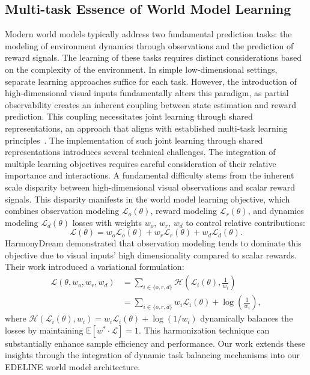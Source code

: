 \subsection{Multi-task Essence of World Model Learning}
Modern world models \cite{Kaiser2020SimPLe, hafner2021DreamerV2, hafner2024DreamerV3, alonso2024diamond} typically address two fundamental prediction tasks: the modeling of environment dynamics through observations and the prediction of reward signals. The learning of these tasks requires distinct considerations based on the complexity of the environment. In simple low-dimensional settings, separate learning approaches suffice for each task. However, the introduction of high-dimensional visual inputs fundamentally alters this paradigm, as partial observability creates an inherent coupling between state estimation and reward prediction. This coupling necessitates joint learning through shared representations, an approach that aligns with established multi-task learning principles~\cite{Caruana1997MultitaskL}.
The implementation of such joint learning through shared representations introduces several technical challenges. The integration of multiple learning objectives requires careful consideration of their relative importance and interactions. A fundamental difficulty stems from the inherent scale disparity between high-dimensional visual observations and scalar reward signals. This disparity manifests in the world model learning objective, which combines observation modeling $\mathcal{L}_o(\theta)$, reward modeling $\mathcal{L}_r(\theta)$, and dynamics modeling $\mathcal{L}_d(\theta)$ losses with weights $w_o$, $w_r$, $w_d$ to control relative contributions:
\begin{equation}
\mathcal{L}(\theta) = w_o\mathcal{L}_o(\theta) + w_r\mathcal{L}_r(\theta) + w_d\mathcal{L}_d(\theta).
\end{equation}
HarmonyDream \cite{ma2024harmonydream} demonstrated that observation modeling tends to dominate this objective due to visual inputs' high dimensionality compared to scalar rewards. Their work introduced a variational formulation:
\begin{equation}
\begin{aligned}
\mathcal{L}(\theta, w_o, w_r, w_d) &= \sum_{i\in \{o,r,d\}} \mathcal{H}(\mathcal{L}_i(\theta), \frac{1}{w_i}) \\&= \sum_{i\in \{o,r,d\}} w_i\mathcal{L}_i(\theta) + \log(\frac{1}{w_i}),
\end{aligned}
\end{equation}
where $\mathcal{H}(\mathcal{L}_i(\theta), w_i) = w_i\mathcal{L}_i(\theta) + \log (1 / w_i)$ dynamically balances the losses by maintaining $\mathbb{E}[w^*\cdot\mathcal{L}] = 1$. This harmonization technique can substantially enhance sample efficiency and performance. Our work extends these insights through the integration of dynamic task balancing mechanisms into our EDELINE world model architecture.

\vspace{-1em}